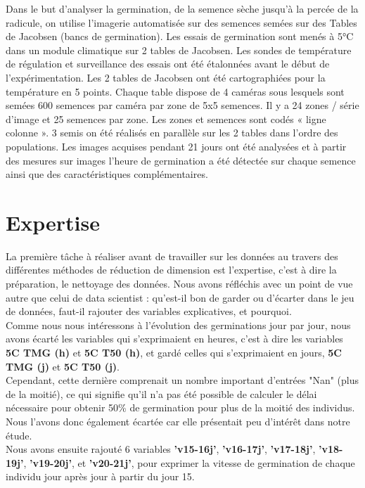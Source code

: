 \documentclass[12pt]{report}
\begin{document}
Dans le but d'analyser la germination, de la semence sèche jusqu’à la percée de la radicule, on utilise l'imagerie automatisée sur des semences semées sur des Tables de Jacobsen (bancs de germination).
Les essais de germination sont menés à 5°C dans un module climatique sur 2 tables de Jacobsen. Les sondes de température de régulation et surveillance des essais ont été étalonnées avant le début de l’expérimentation. Les 2 tables de Jacobsen ont été cartographiées pour la température en 5 points.
Chaque table dispose de 4 caméras sous lesquels sont semées 600 semences par caméra par zone de 5x5 semences. Il y a 24 zones / série d’image et 25 semences par zone. Les zones et semences sont codés « ligne colonne ».
3 semis on été réalisés en parallèle sur les 2 tables dans l’ordre des populations.
Les images acquises pendant 21 jours ont été analysées et à partir des mesures sur images l’heure de germination a été détectée sur chaque semence ainsi que des caractéristiques complémentaires.\\

    
\section{Expertise}

La première tâche à réaliser avant de travailler sur les données au travers des différentes méthodes de réduction de dimension est l'expertise, c'est à dire la préparation, le nettoyage des données. Nous avons réfléchis avec un point de vue autre que celui de data scientist : qu'est-il bon de garder ou d'écarter dans le jeu de données, faut-il rajouter des variables explicatives, et pourquoi.\\

Comme nous nous intéressons à l'évolution des germinations jour par jour, nous avons écarté les variables qui s'exprimaient en heures, c'est à dire les variables \textbf{5\textdegree C TMG (h)} et \textbf{5\textdegree C T50 (h)}, et gardé celles qui s'exprimaient en jours, \textbf{5\textdegree C TMG (j)} et \textbf{5\textdegree C T50 (j)}.\\
Cependant, cette dernière comprenait un nombre important d'entrées "Nan" (plus de la moitié), ce qui signifie qu'il n'a pas été possible de calculer le délai nécessaire pour obtenir 50\% de germination pour plus de la moitié des individus. Nous l'avons donc également écartée car elle présentait peu d'intérêt dans notre étude.\\

Nous avons ensuite rajouté 6 variables \textbf{'v15-16j'}, \textbf{'v16-17j'}, \textbf{'v17-18j'}, \textbf{'v18-19j'}, \textbf{'v19-20j'}, et \textbf{'v20-21j'},  pour exprimer la vitesse de germination de chaque individu jour après jour à partir du jour 15.
\end{document}
